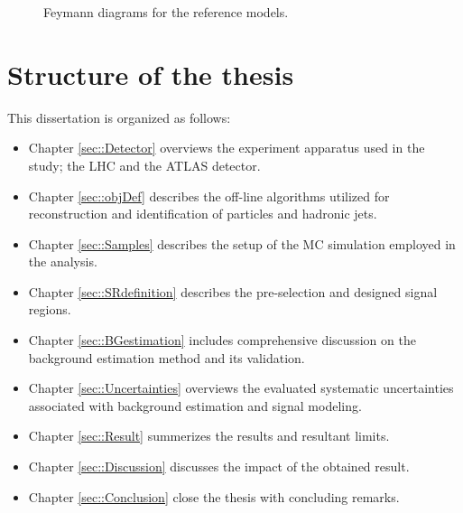 
\begin{figure}[h]
  \centering
    \caption{ Feymann diagrams for the reference models. }
    \label{fig:Introduction::refModels}
\end{figure}



\clearpage







\clearpage
\section{Structure of the thesis}
This dissertation is organized as follows:
\begin{itemize}
\item Chapter \ref{sec::Detector} overviews the experiment apparatus used in the study; the LHC and the ATLAS detector. 
\item Chapter \ref{sec::objDef} describes the off-line algorithms utilized for reconstruction and identification of particles and hadronic jets. 
\item Chapter \ref{sec::Samples} describes the setup of the MC simulation employed in the analysis. 
%
\item Chapter \ref{sec::SRdefinition} describes the pre-selection and designed signal regions.
\item Chapter \ref{sec::BGestimation} includes comprehensive discussion on the background estimation method and its validation.
\item Chapter \ref{sec::Uncertainties} overviews the evaluated systematic uncertainties associated with background estimation and signal modeling. 
\item Chapter \ref{sec::Result} summerizes the results and resultant limits. 
\item Chapter \ref{sec::Discussion} discusses the impact of the obtained result.
\item Chapter \ref{sec::Conclusion} close the thesis with concluding remarks.
\end{itemize}

\fi

